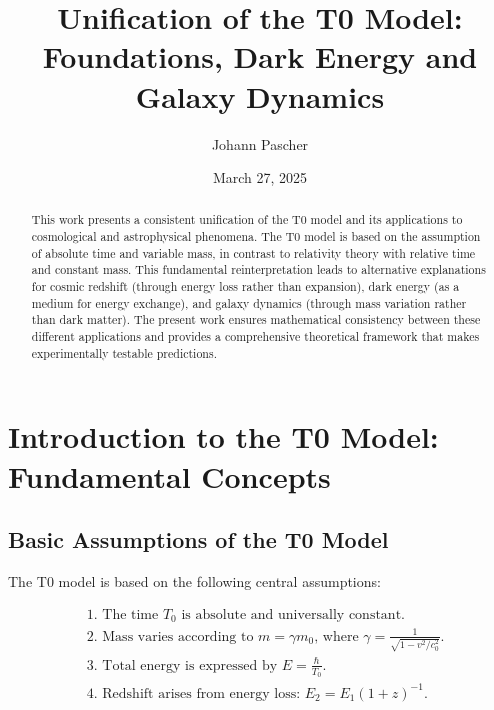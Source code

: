 \documentclass[a4paper,12pt]{article}
\begin{document}
	
	\title{Unification of the T0 Model: \\Foundations, Dark Energy and Galaxy Dynamics}
	\author{Johann Pascher}
	\date{March 27, 2025}
	\maketitle
	
	\begin{abstract}
		This work presents a consistent unification of the T0 model and its applications to cosmological and astrophysical phenomena. The T0 model is based on the assumption of absolute time and variable mass, in contrast to relativity theory with relative time and constant mass. This fundamental reinterpretation leads to alternative explanations for cosmic redshift (through energy loss rather than expansion), dark energy (as a medium for energy exchange), and galaxy dynamics (through mass variation rather than dark matter). The present work ensures mathematical consistency between these different applications and provides a comprehensive theoretical framework that makes experimentally testable predictions.
	\end{abstract}
	
	\tableofcontents
	\newpage
	
	\section{Introduction to the T0 Model: Fundamental Concepts}
	
	\subsection{Basic Assumptions of the T0 Model}
	
	The T0 model is based on the following central assumptions:
	
	\begin{tcolorbox}[colback=blue!5!white,colframe=blue!75!black,title=Basic Assumptions of the T0 Model]
		\begin{align}
			&\text{1. The time $T_0$ is absolute and universally constant.} \\
			&\text{2. Mass varies according to $m = \gamma m_0$, where $\gamma = \frac{1}{\sqrt{1-v^2/c_0^2}}$.} \\
			&\text{3. Total energy is expressed by $E = \frac{\hbar}{T_0}$.} \\
			&\text{4. Redshift arises from energy loss: $E_2 = E_1(1+z)^{-1}$.}
		\end{align}
	\end{tcolorbox}
	
\end{document}
